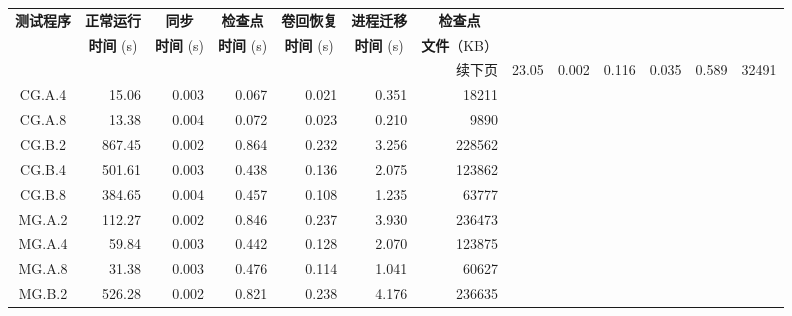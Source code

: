 \begin{ThreePartTable}
\begin{longtable}[c]{c*{6}{r}}
    \toprule
    \textbf{测试程序\tnote{b}} & \multicolumn{1}{c}{\textbf{正常运行}} & \multicolumn{1}{c}{\textbf{同步}}
                           & \multicolumn{1}{c}{\textbf{检查点}}       & \multicolumn{1}{c}{\textbf{卷回恢复}}
                           & \multicolumn{1}{c}{\textbf{进程迁移}}     & \multicolumn{1}{c}{\textbf{检查点}}   \\
                           & \multicolumn{1}{c}{\textbf{时间} (s)}     & \multicolumn{1}{c}{\textbf{时间} (s)}
                           & \multicolumn{1}{c}{\textbf{时间} (s)}     & \multicolumn{1}{c}{\textbf{时间} (s)}
                           & \multicolumn{1}{c}{\textbf{时间} (s)}     & \textbf{文件}（KB）                   \\
    \midrule
    \endhead
    \hline
    \multicolumn{7}{r}{续下页}
    \endfoot
    \insertTableNotes
    \endlastfoot
    CG.C.2                 & 23.05                               & 0.002                               & 0.116          & 0.035 & 0.589 & 32491  \\
    CG.A.4                 & 15.06                               & 0.003                               & 0.067          & 0.021 & 0.351 & 18211  \\
    CG.A.8                 & 13.38                               & 0.004                               & 0.072          & 0.023 & 0.210 & 9890   \\
    CG.B.2                 & 867.45                              & 0.002                               & 0.864          & 0.232 & 3.256 & 228562 \\
    CG.B.4                 & 501.61                              & 0.003                               & 0.438          & 0.136 & 2.075 & 123862 \\
    CG.B.8                 & 384.65                              & 0.004                               & 0.457          & 0.108 & 1.235 & 63777  \\
    MG.A.2                 & 112.27                              & 0.002                               & 0.846\tnote{a} & 0.237 & 3.930 & 236473 \\
    MG.A.4                 & 59.84                               & 0.003                               & 0.442          & 0.128 & 2.070 & 123875 \\
    MG.A.8                 & 31.38                               & 0.003                               & 0.476          & 0.114 & 1.041 & 60627  \\
    MG.B.2                 & 526.28                              & 0.002                               & 0.821          & 0.238 & 4.176 & 236635 \\

\end{longtable}
\end{ThreePartTable}
